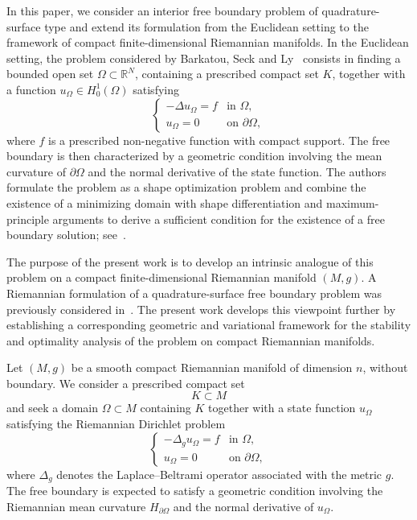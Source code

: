 \documentclass{article}
\begin{document}
In this paper, we consider an interior free boundary problem of
quadrature-surface type and extend its formulation from the Euclidean
setting to the framework of compact finite-dimensional Riemannian
manifolds. In the Euclidean setting, the problem considered by
Barkatou, Seck and Ly~\cite{BLS2} consists in finding a bounded open set
$\Omega\subset\mathbb{R}^N$, containing a prescribed compact set $K$,
together with a function $u_\Omega\in H_0^1(\Omega)$ satisfying
\begin{equation}
\begin{cases}
-\Delta u_\Omega=f & \text{in }\Omega,\\
u_\Omega=0 & \text{on }\partial\Omega,
\end{cases}
\label{eq:euclidean-dirichlet-introduction}
\end{equation}
where $f$ is a prescribed non-negative function with compact support.
The free boundary is then characterized by a geometric condition
involving the mean curvature of $\partial\Omega$ and the normal
derivative of the state function. The authors formulate the problem as
a shape optimization problem and combine the existence of a minimizing
domain with shape differentiation and maximum-principle arguments to
derive a sufficient condition for the existence of a free boundary
solution; see~\cite{BLS2}.

The purpose of the present work is to develop an intrinsic analogue of
this problem on a compact finite-dimensional Riemannian manifold
$(M,g)$. A Riemannian formulation of a quadrature-surface free boundary
problem was previously considered in~\cite{DS1}. The present work
develops this viewpoint further by establishing a corresponding
geometric and variational framework for the stability and optimality
analysis of the problem on compact Riemannian manifolds.

Let $(M,g)$ be a smooth compact Riemannian manifold of dimension $n$,
without boundary. We consider a prescribed compact set
\[
K\subset M
\]
and seek a domain $\Omega\subset M$ containing $K$ together with a
state function $u_\Omega$ satisfying the Riemannian Dirichlet problem
\begin{equation}
\begin{cases}
-\Delta_g u_\Omega=f & \text{in }\Omega,\\
u_\Omega=0 & \text{on }\partial\Omega,
\end{cases}
\label{eq:riemannian-dirichlet-introduction}
\end{equation}
where $\Delta_g$ denotes the Laplace--Beltrami operator associated with
the metric $g$. The free boundary is expected to satisfy a geometric
condition involving the Riemannian mean curvature
$H_{\partial\Omega}$ and the normal derivative of $u_\Omega$.
\end{document}
